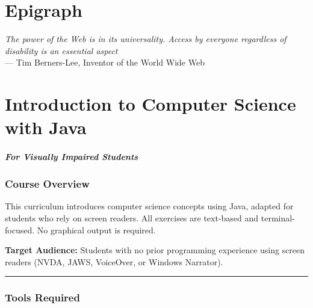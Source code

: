 \documentclass[
  justified,
  openright,
]{tufte-book}
\let\subsubsection\paragraph
\let\paragraph\paragraph
\let\subsubsection\paragraph
\let\paragraph\paragraph
\begin{document}
\chapter*{Epigraph}
\thispagestyle{empty}
\begin{flushright}
  \vspace*{0.25\textheight}
  {\itshape The power of the Web is in its universality. Access by everyone regardless of disability is an essential aspect}\\[1em]
  --- Tim Berners-Lee, Inventor of the World Wide Web
\end{flushright}
\clearpage

\newpage

\mainmatter
{} %


\chapter*{Introduction to Computer Science with Java}

\subsubsection{For Visually Impaired
Students}\label{for-visually-impaired-students}

\subsection{Course Overview}\label{course-overview}

This curriculum introduces computer science concepts using Java, adapted
for students who rely on screen readers. All exercises are text-based
and terminal-focused. No graphical output is required.

\textbf{Target Audience:} Students with no prior programming experience
using screen readers (NVDA, JAWS, VoiceOver, or Windows Narrator).

\begin{center}\rule{0.5\linewidth}{0.5pt}\end{center}

\subsection{Tools Required}\label{tools-required}
\end{document}
